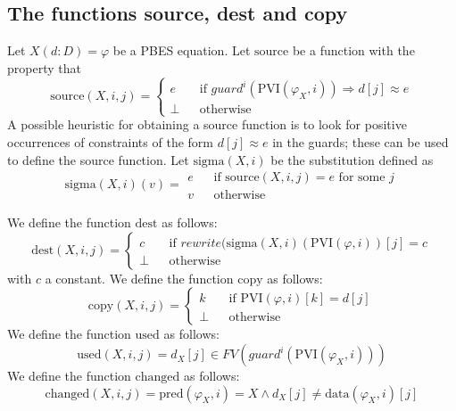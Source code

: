 \subsection{The functions source, dest and copy}

Let $X(d:D)=\varphi $ be a PBES equation. Let $\mathrm{source}$ be a
function with the property that 
\begin{equation*}
\mathrm{source}(X,i,j)=\left\{ 
\begin{array}{lll}
e &  & \text{if }guard^{i}(\mathrm{PVI}(\varphi _{X},i))\Rightarrow
d[j]\approx e \\ 
\bot &  & \text{otherwise}%
\end{array}%
\right.
\end{equation*}%
A possible heuristic for obtaining a source function is to look for positive
occurrences of constraints of the form $d[j]\approx e$ in the guards; these
can be used to define the source function. Let $\mathrm{sigma}(X,i)$ be the
substitution defined as%
\begin{equation*}
\mathrm{sigma}(X,i)(v)=%
\begin{array}{lll}
e &  & \text{if }\mathrm{source}(X,i,j)=e\text{ for some }j \\ 
v &  & \text{otherwise}%
\end{array}%
\end{equation*}

We define the function $\mathrm{dest}$ as follows:%
\begin{equation*}
\mathrm{dest}(X,i,j)=\left\{ 
\begin{array}{lll}
c &  & \text{if }rewrite(\mathrm{sigma}(X,i)(\mathrm{PVI}(\varphi ,i))[j]=c
\\ 
\bot &  & \text{otherwise}%
\end{array}%
\right.
\end{equation*}%
with $c$ a constant. We define the function $\mathrm{copy}$ as follows:%
\begin{equation*}
\mathrm{copy}(X,i,j)=\left\{ 
\begin{array}{lll}
k &  & \text{if }\mathrm{PVI}(\varphi ,i)[k]=d[j] \\ 
\bot &  & \text{otherwise}%
\end{array}%
\right.
\end{equation*}%
We define the function $\mathrm{used}$ as follows:%
\begin{equation*}
\mathrm{used}(X,i,j)=d_{X}[j]\in FV(guard^{i}(\mathrm{PVI}(\varphi _{X},i)))
\end{equation*}%
We define the function $\mathrm{changed}$ as follows:%
\begin{equation*}
\mathrm{changed}(X,i,j)=\mathrm{pred}(\varphi _{X},i)=X\wedge d_{X}[j]\neq 
\mathrm{data}(\varphi _{X},i)[j]
\end{equation*}

